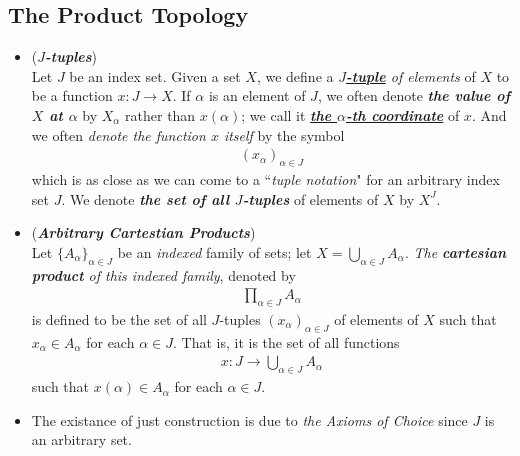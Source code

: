 \documentclass[11pt]{article}
\begin{document}
\subsection{The Product Topology}
\begin{itemize}
\item \begin{definition} (\emph{\textbf{$J$-tuples}})\\
Let $J$ be an index set. Given a set $X$, we define a \emph{\underline{\textbf{$J$-tuple}} of elements} of $X$ to be a function $x : J \rightarrow X$. If $\alpha$ is an element of $J$, we often denote \emph{\textbf{the value of $X$ at $\alpha$}} by $X_{\alpha}$ rather than $x(\alpha)$; we call it \underline{\emph{\textbf{the $\alpha$-th coordinate}}} of $x$. And we often \emph{denote the function $x$ itself} by the symbol
\begin{align*}
(x_{\alpha})_{\alpha \in J}
\end{align*}
which is as close as we can come to a ``\emph{tuple notation}" for an arbitrary index set $J$. We denote \emph{\textbf{the set of all $J$-tuples}} of elements of $X$ by $X^{J}$.
\end{definition}

\item \begin{definition} (\emph{\textbf{Arbitrary Cartestian Products}})\\
Let $\{A_{\alpha}\}_{\alpha \in J}$ be an \emph{indexed} family of sets; let $X = \bigcup_{\alpha \in J}A_{\alpha}$. \emph{The \textbf{cartesian product} of this indexed family}, denoted by
\begin{align*}
\prod_{\alpha \in J} A_{\alpha}
\end{align*}
is defined to be the set of all $J$-tuples $(x_{\alpha})_{\alpha \in J}$ of elements of $X$ such that $x_{\alpha} \in A_{\alpha}$ for each $\alpha \in J$. That is, it is the set of all functions
\begin{align*}
x: J \rightarrow \bigcup_{\alpha \in J}A_{\alpha}
\end{align*}
such that $x(\alpha) \in A_{\alpha}$ for each $\alpha \in J$.
\end{definition}

\item \begin{remark}
The existance of just construction is due to \emph{the Axioms of Choice} since $J$ is an arbitrary set.
\end{remark}


\end{itemize}
\end{document}
